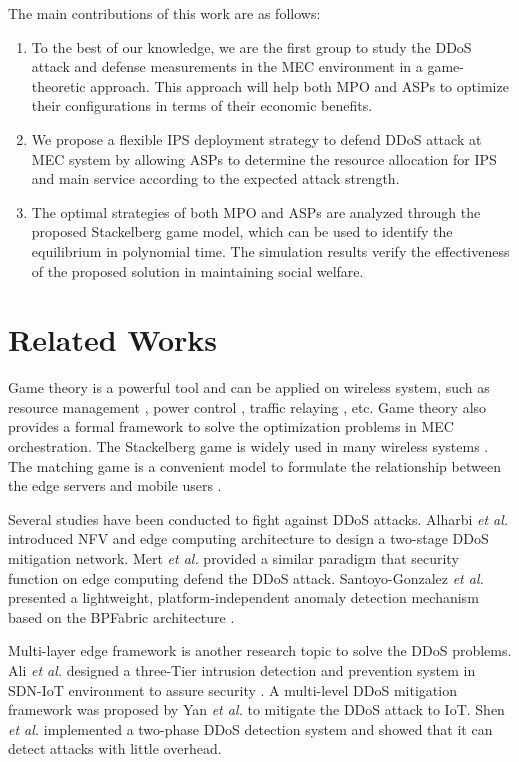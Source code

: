 \documentclass[conference]{IEEEtran}
\begin{document}
The main contributions of this work are as follows:
\begin{enumerate}
    \item To the best of our knowledge, we are the first group to study the DDoS attack and defense measurements in the MEC environment in a game-theoretic approach. This approach will help both MPO and ASPs to optimize their configurations in terms of their economic benefits.
    \item We propose a flexible IPS deployment strategy to defend DDoS attack at MEC system by allowing ASPs to determine the resource allocation for IPS and main service according to the expected attack strength. 
    \item The optimal strategies of both MPO and ASPs are analyzed through the proposed Stackelberg game model, which can be used to identify the equilibrium in polynomial time. The simulation results verify the effectiveness of the proposed solution in maintaining social welfare. 
\end{enumerate}

\section{Related Works}

Game theory is a powerful tool and can be applied on wireless system, such as resource management \cite{Xu} \cite{Chen2}, power control \cite{Li3} \cite{Zhao}, traffic relaying \cite{Li4}, etc. Game theory also provides a formal framework to solve the optimization problems in MEC orchestration. The Stackelberg game is widely used in many wireless systems \cite{Chang} \cite{Wang2} \cite{Lin2} \cite{Yu}. The matching game is a convenient model to formulate the relationship between the edge servers and mobile users \cite{Liu2} \cite{Lin} \cite{Zhang2}. 

Several studies have been conducted to fight against DDoS attacks.  Alharbi \emph{et al.} introduced NFV and edge computing architecture to design a two-stage DDoS mitigation network\cite{Alharbi}. Mert \emph{et al.}  provided a similar paradigm that security function on edge computing defend the DDoS attack\cite{Mert}. Santoyo-Gonzalez \emph{et al.} presented a lightweight, platform-independent anomaly
detection mechanism based on the BPFabric architecture \cite{Santoyo-Gonzalez}. 

Multi-layer edge framework is another research topic to solve the DDoS problems. Ali \emph{et al.} designed a three-Tier intrusion detection and prevention system in SDN-IoT environment to assure security \cite{Ali}. A multi-level DDoS mitigation framework \cite{Yan} was proposed by Yan \emph{et al.}  to mitigate the DDoS attack to IoT. Shen \emph{et al.} \cite{Shen} implemented a two-phase DDoS detection system and showed that it can detect attacks with little overhead.
\end{document}
